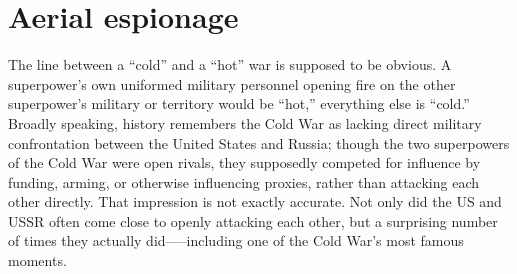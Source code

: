 \documentclass[14pt]{extarticle}
\begin{document}


\section{Aerial espionage}
The line between a \enquote{cold} and a \enquote{hot} war is supposed to be obvious. A superpower's own uniformed military personnel opening fire on the other superpower's military or territory would be \enquote{hot,} everything else is \enquote{cold.} Broadly speaking, history remembers the Cold War as lacking direct military confrontation between the United States and Russia; though the two superpowers of the Cold War were open rivals, they supposedly competed for influence by funding, arming, or otherwise influencing proxies, rather than attacking each other directly. That impression is not exactly accurate. Not only did the US and USSR often come close to openly attacking each other, but a surprising number of times they actually did—--including one of the Cold War's most famous moments.

\end{document}
